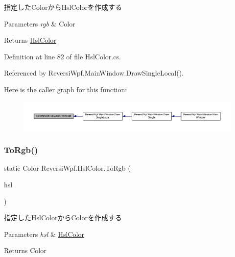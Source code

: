 指定した\+Colorから\+Hsl\+Colorを作成する 


\begin{DoxyParams}{Parameters}
{\em rgb} & Color\\
\hline
\end{DoxyParams}
\begin{DoxyReturn}{Returns}
\hyperlink{class_reversi_wpf_1_1_hsl_color}{Hsl\+Color}
\end{DoxyReturn}


Definition at line 82 of file Hsl\+Color.\+cs.



Referenced by Reversi\+Wpf.\+Main\+Window.\+Draw\+Single\+Local().

Here is the caller graph for this function\+:\nopagebreak
\begin{figure}[H]
\begin{center}
\leavevmode
\includegraphics[width=350pt]{class_reversi_wpf_1_1_hsl_color_a0725f254d6e13cd9e7114fe8b1645954_icgraph}
\end{center}
\end{figure}
\mbox{\label{class_reversi_wpf_1_1_hsl_color_aba11bae61cc67fcece49cbc4b18db8b1}} 
\subsubsection{\texorpdfstring{To\+Rgb()}{ToRgb()}}
{\footnotesize\ttfamily static Color Reversi\+Wpf.\+Hsl\+Color.\+To\+Rgb (\begin{DoxyParamCaption}\item[{\hyperlink{class_reversi_wpf_1_1_hsl_color}{Hsl\+Color}}]{hsl }\end{DoxyParamCaption})\hspace{0.3cm}{\ttfamily [static]}}



指定した\+Hsl\+Colorから\+Colorを作成する 


\begin{DoxyParams}{Parameters}
{\em hsl} & \hyperlink{class_reversi_wpf_1_1_hsl_color}{Hsl\+Color}\\
\hline
\end{DoxyParams}
\begin{DoxyReturn}{Returns}
Color
\end{DoxyReturn}



